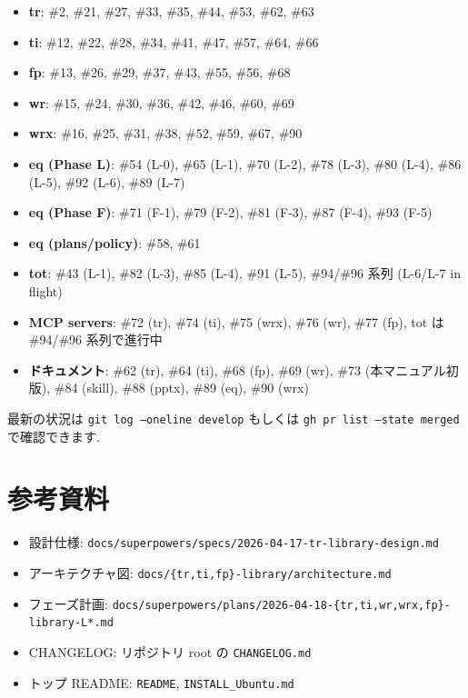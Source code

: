 \documentclass[11pt,a4paper]{report}
\begin{document}
\begin{itemize}[leftmargin=1.5em]
  \item \textbf{tr}: \#2, \#21, \#27, \#33, \#35, \#44, \#53, \#62, \#63
  \item \textbf{ti}: \#12, \#22, \#28, \#34, \#41, \#47, \#57, \#64, \#66
  \item \textbf{fp}: \#13, \#26, \#29, \#37, \#43, \#55, \#56, \#68
  \item \textbf{wr}: \#15, \#24, \#30, \#36, \#42, \#46, \#60, \#69
  \item \textbf{wrx}: \#16, \#25, \#31, \#38, \#52, \#59, \#67, \#90
  \item \textbf{eq (Phase L)}: \#54 (L-0), \#65 (L-1), \#70 (L-2), \#78 (L-3), \#80 (L-4), \#86 (L-5), \#92 (L-6), \#89 (L-7)
  \item \textbf{eq (Phase F)}: \#71 (F-1), \#79 (F-2), \#81 (F-3), \#87 (F-4), \#93 (F-5)
  \item \textbf{eq (plans/policy)}: \#58, \#61
  \item \textbf{tot}: \#43 (L-1), \#82 (L-3), \#85 (L-4), \#91 (L-5), \#94/\#96 系列 (L-6/L-7 in flight)
  \item \textbf{MCP servers}: \#72 (tr), \#74 (ti), \#75 (wrx), \#76 (wr), \#77 (fp), tot は \#94/\#96 系列で進行中
  \item \textbf{ドキュメント}: \#62 (tr), \#64 (ti), \#68 (fp), \#69 (wr), \#73 (本マニュアル初版), \#84 (skill), \#88 (pptx), \#89 (eq), \#90 (wrx)
\end{itemize}

最新の状況は \texttt{git log --oneline develop} もしくは
\texttt{gh pr list --state merged} で確認できます.

\section{参考資料}

\begin{itemize}[leftmargin=1.5em]
  \item 設計仕様: \texttt{docs/superpowers/specs/2026-04-17-tr-library-design.md}
  \item アーキテクチャ図: \texttt{docs/\{tr,ti,fp\}-library/architecture.md}
  \item フェーズ計画: \texttt{docs/superpowers/plans/2026-04-18-\{tr,ti,wr,wrx,fp\}-library-L*.md}
  \item CHANGELOG: リポジトリ root の \texttt{CHANGELOG.md}
  \item トップ README: \texttt{README}, \texttt{INSTALL\_Ubuntu.md}
\end{itemize}
\end{document}
